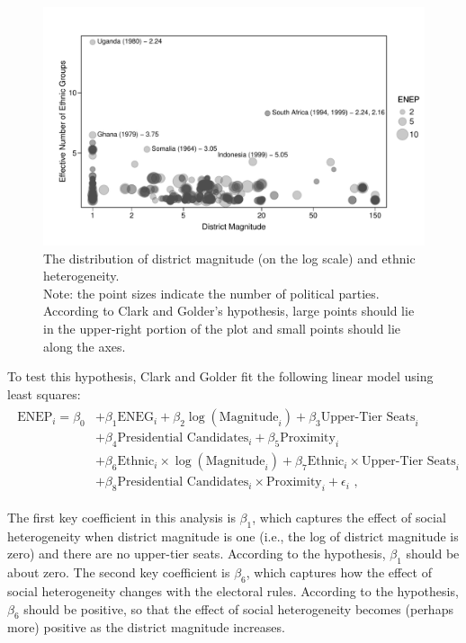 \documentclass[12pt]{article}
\begin{document}
\begin{figure}[h!]
\begin{center}
\includegraphics[scale = 0.8]{figs/cg-scatter.pdf}
\caption{The distribution of district magnitude (on the log scale) and ethnic heterogeneity.\\
Note: the point sizes indicate the number of political parties. 
According to Clark and Golder's hypothesis, large points should lie in the upper-right portion of the plot and small points should lie along the axes.}\label{fig:cg-scatter}
\end{center}
\end{figure}

To test this hypothesis, Clark and Golder fit the following linear model using least squares:
\begin{align}
\begin{split}
\text{ENEP}_i = \beta_0 &+ \beta_1 \text{ENEG}_i + \beta_2 \log(\text{Magnitude}_i) + \beta_3 \text{Upper-Tier Seats}_i\\
                                                     &+\beta_4 \text{Presidential Candidates}_i + \beta_5 \text{Proximity}_i\\
                                                     &+ \beta_6 \text{Ethnic}_i \times \log (\text{Magnitude}_i) + \beta_7 \text{Ethnic}_i \times \text{Upper-Tier Seats}_i\\
                                                     &+ \beta_8 \text{Presidential Candidates}_i \times \text{Proximity}_i + \epsilon_i\text{ ,}
\end{split}                                                     
\end{align}

The first key coefficient in this analysis is $\beta_1$, which captures the effect of social heterogeneity when district magnitude is one (i.e., the log of district magnitude is zero) and there are no upper-tier seats. 
According to the hypothesis, $\beta_1$ should be about zero. 
The second key coefficient is $\beta_6$, which captures how the effect of social heterogeneity changes with the electoral rules. 
According to the hypothesis, $\beta_6$ should be positive, so that the effect of social heterogeneity becomes (perhaps more) positive as the district magnitude increases.
\end{document}
